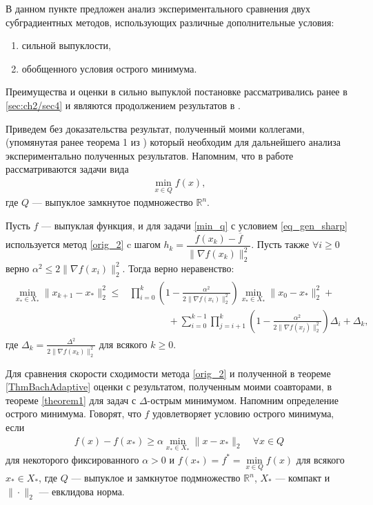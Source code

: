     В данном пункте предложен анализ экспериментального сравнения двух субградиентных методов, использующих различные дополнительные условия:
    \begin{enumerate}
        \item сильной выпуклости,
        \item обобщенного условия острого минимума.
    \end{enumerate}
    Преимущества и оценки в сильно выпуклой постановке рассматривались ранее в \ref{sec:ch2/sec4} и являются продолжением результатов в \cite{Bach_2012}.

    Приведем без доказательства результат, полученный моими коллегами, (упомянутая ранее теорема 1 из \cite{sharp22}) который необходим для дальнейшего анализа экспериментально полученных результатов. Напомним, что в работе рассматриваются задачи вида
    \begin{gather}\label{min_q}
        \min_{x\in Q} f(x),
    \end{gather}
    где $Q$ --- выпуклое замкнутое подмножество $\mathbb{R}^{n}$. 
    \begin{theorem}\label{theorem1}
        Пусть $f$ --- выпуклая функция, и для задачи \eqref{min_q} с условием \eqref{eq_gen_sharp} используется метод \eqref{orig_2} c шагом
        $h_k = \dfrac{f(x_k) - \overline{f}}{\| \nabla f(x_k) \|_2^2}$. Пусть также $\forall i \geq 0$ верно $\alpha^2 \leq 2 \| \nabla f(x_i) \|_2^2$. Тогда верно неравенство:
        \begin{gather}\label{adaptive_estimate}
            \begin{aligned}
            \min_{x_* \in X_*} \|x_{k+1} - x_* \|_2^2 \leq &  \prod_{i=0}^k \left ( 1 - \frac{\alpha^2}{2 \| \nabla f(x_i) \|_2^2} \right ) \min_{x_* \in X_*} \|x_0 - x_* \|_2^2 + \\& 
            \qquad \qquad + \sum_{i=0}^{k-1} \prod_{j=i+1}^k \left ( 1 - \frac{\alpha^2}{2 \| \nabla f(x_j) \|_2^2} \right )\Delta_i + \Delta_k,
            \end{aligned}
        \end{gather}
        где $\Delta_k = \frac{\Delta^2}{2 \| \nabla f(x_k) \|_2^2}$ для всякого $k \geqslant 0$.
    \end{theorem}

    Для сравнения скорости сходимости метода \eqref{orig_2} и полученной в теореме \ref{ThmBachAdaptive} оценки с результатом, полученным моими соавторами, в теореме \ref{theorem1} для задач с $\Delta$-острым минимумом. Напомним определение острого минимума. Говорят, что $f$ удовлетворяет условию острого минимума, если
    \begin{gather}\label{sm}
        f(x) - f(x_*) \geq \alpha \min_{x_* \in X_*} \|x- x_*\|_2 \quad \forall x \in Q
    \end{gather}
    для некоторого фиксированного $\alpha >0$ и $f(x_*) = f^* = \min\limits_{x\in Q} f(x)$ для всякого $x_* \in X_*$, где $Q$ --- выпуклое и замкнутое подмножество $\mathbb{R}^n$, $X_*$ --- компакт и $\|\cdot\|_2$ --- евклидова норма. 
    

